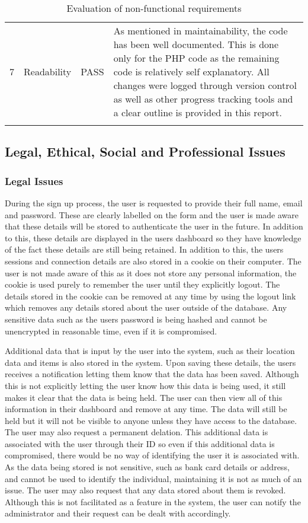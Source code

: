 \begin{longtable}{@{}p{}p{}p{}p{}@{}}
	7 & Readability & \textcolor{PassGreen}{PASS} & As mentioned in maintainability, the code has been well documented. This is done only for the PHP code as the remaining code is relatively self explanatory. All changes were logged through version control as well as other progress tracking tools and a clear outline is provided in this report. \\
	\caption{Evaluation of non-functional requirements}
	\label{table:Non-Functional_Evaluation}
\end{longtable}

\subsection{Legal, Ethical, Social and Professional Issues}

\subsubsection{Legal Issues}
During the sign up process, the user is requested to provide their full name, email and password. These are clearly labelled on the form and the user is made aware that these details will be stored to authenticate the user in the future. In addition to this, these details are displayed in the users dashboard so they have knowledge of the fact these details are still being retained. In addition to this, the users sessions and connection details are also stored in a cookie on their computer. The user is not made aware of this as it does not store any personal information, the cookie is used purely to remember the user until they explicitly logout. The details stored in the cookie can be removed at any time by using the logout link which removes any details stored about the user outside of the database. Any sensitive data such as the users password is being hashed and cannot be unencrypted in reasonable time, even if it is compromised.

Additional data that is input by the user into the system, such as their location data and items is also stored in the system. Upon saving these details, the users receives a notification letting them know that the data has been saved. Although this is not explicitly letting the user know how this data is being used, it still makes it clear that the data is being held. The user can then view all of this information in their dashboard and remove at any time. The data will still be held but it will not be visible to anyone unless they have access to the database. The user may also request a permanent delation. This additional data is associated with the user through their ID so even if this additional data is compromised, there would be no way of identifying the user it is associated with. As the data being stored is not sensitive, such as bank card details or address, and cannot be used to identify the individual, maintaining it is not as much of an issue. The user may also request that any data stored about them is revoked. Although this is not facilitated as a feature in the system, the user can notify the administrator and their request can be dealt with accordingly.

